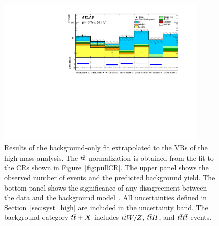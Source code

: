 \begin{figure}[htbp]
	\centering
	\includegraphics[width=0.9\textwidth]{figures/ewk_prod/etmiss_results/histpull_pulls_in_VR_qcdStrong}
	\caption{Results of the background-only fit extrapolated to the VRs of the high-mass analysis. The $t\overline{t}$ normalization 
		is obtained from the fit to the CRs shown in Figure~\ref{fig:pullCR}. The upper panel shows 
		the observed number of events and the predicted background yield. The bottom panel shows the significance of any disagreement between the data and the background model~\cite{Choudalakis2012}.
		All uncertainties  defined in Section~\ref{sec:syst_high} are included in the 
		uncertainty band. The background category $t\overline{t}+X$ includes $t\overline{t} W/Z$, 
		$t\overline{t} H$, and $t\overline{t} t\overline{t}$ events. }
	\label{fig:pullVR}
\end{figure}

